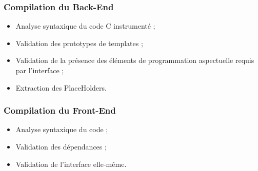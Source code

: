 \documentclass[]{beamer}
\begin{document}
\begin{frame}
\frametitle{Compilation du Back-End}
\begin{itemize}[<+->]
    \item Analyse syntaxique du code C instrumenté ;
    \item Validation des prototypes de templates ;
    \item Validation de la présence des éléments de programmation aspectuelle
            requis par l'interface ;
    \item Extraction des PlaceHolders.
\end{itemize}
\end{frame}

\begin{frame}
\frametitle{Compilation du Front-End}
\begin{itemize}[<+->]
    \item Analyse syntaxique du code ;
    \item Validation des dépendances ;
    \item Validation de l'interface elle-même.
\end{itemize}
\end{frame}
\end{document}
